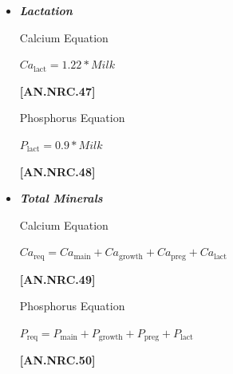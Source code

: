 \begin{refsection}
\begin{itemize}
\begin{center}
    \textbf{If:} \( DOP > 190.0\ else\)
\end{center}

\vspace{0.5cm}
            {\raggedleft \textbf{[AN.NRC.46]}\par}
\vspace{0.5cm}

        \item \textbf{\textit{Lactation}} 
        \vspace{0.2cm}

Calcium Equation
\begin{center}
    \(Ca_{\text{lact}} = 1.22 * Milk\)
\end{center}

\vspace{0.5cm}
            {\raggedleft \textbf{[AN.NRC.47]}\par}
\vspace{0.5cm}

Phosphorus Equation
                
\begin{center}
    \(P_{\text{lact}} = 0.9 * Milk \)
\end{center}

\vspace{0.5cm}
            {\raggedleft \textbf{[AN.NRC.48]}\par}
\vspace{0.5cm}

        \item \textbf{\textit{Total Minerals}}  
                \vspace{0.2cm}

Calcium Equation
\begin{center}
    \(Ca_{\text{req}} = Ca_{\text{main}} + Ca_{\text{growth}} + Ca_{\text{preg}} + Ca_{\text{lact}}\)
\end{center}

\vspace{0.5cm}
            {\raggedleft \textbf{[AN.NRC.49]}\par}
\vspace{0.5cm}

Phosphorus Equation
\begin{center}
    \(P_{\text{req}} = P_{\text{main}} + P_{\text{growth}} + P_{\text{preg}} + P_{\text{lact}}\)
\end{center}

\vspace{0.5cm}
            {\raggedleft \textbf{[AN.NRC.50]}\par}
\vspace{0.5cm}


\end{itemize}
\end{refsection}
